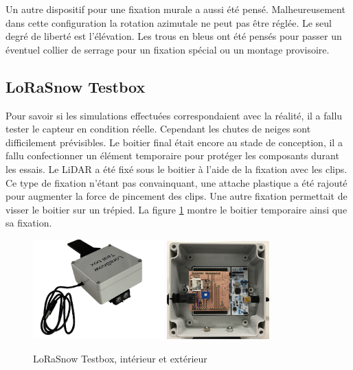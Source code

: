 Un autre dispositif pour une fixation murale a aussi été pensé. Malheureusement dans cette configuration 
la rotation azimutale ne peut pas être réglée. Le seul degré de liberté est l’élévation. Les trous en 
bleus ont été pensés pour passer un éventuel collier de serrage pour un fixation spécial ou un montage 
provisoire.

\subsection{LoRaSnow Testbox}

Pour savoir si les simulations effectuées correspondaient avec la réalité, il a fallu tester le capteur 
en condition réelle. Cependant les chutes de neiges sont difficilement prévisibles. Le boitier final était 
encore au stade de conception, il a fallu confectionner un élément temporaire pour protéger les composants 
durant les essais. Le LiDAR a été fixé sous le boitier à l'aide de la fixation avec les clips. Ce type de fixation 
n’étant pas convainquant, une attache plastique a été rajouté pour augmenter la force de pincement des clips. 
Une autre fixation permettait de visser le boitier sur un trépied. La figure \ref{fig:testbox} montre le boitier 
temporaire ainsi que sa fixation.

\begin{figure}[H]
    \centering
    \includegraphics[width=0.45\textwidth]{Images/photos_PGA/TestBox-removebg-preview.png}
    \includegraphics[width=0.35\textwidth]{Images/photos_PGA/testboxinside.jpg}
    \caption{LoRaSnow Testbox, intérieur et extérieur}
    \label{fig:testbox}
\end{figure}

